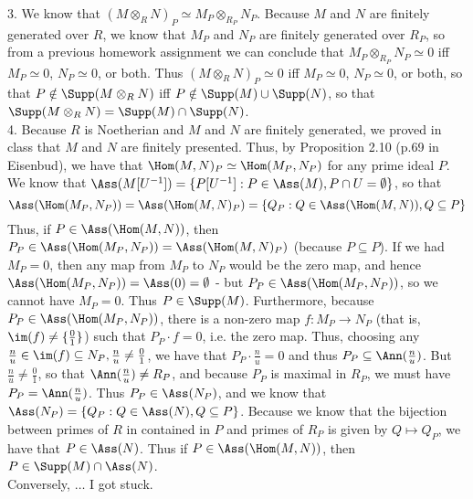 \documentclass[11pt]{article}
\begin{document}
\num{3.} We know that $(M\otimes_R N)_P\simeq M_P\otimes_{R_P}N_P$. Because $M$ and $N$ are finitely generated over $R$, we know that $M_P$ and $N_P$ are finitely generated over $R_P$, so from a previous homework assignment we can conclude that $M_P\otimes_{R_P}N_P\simeq 0$ iff $M_P\simeq 0$, $N_P\simeq 0$, or both. Thus $(M\otimes_R N)_P\simeq 0$ iff $M_P\simeq 0$, $N_P\simeq 0$, or both, so that $P\notin\Supp(M\otimes_R N)$ iff $P\notin\Supp(M)\cup\Supp(N)$, so that $\Supp(M\otimes_R N)=\Supp(M)\cap\Supp(N)$.     \\

\num{4.} Because $R$ is Noetherian and $M$ and $N$ are finitely generated, we proved in class that $M$ and $N$ are finitely presented. Thus, by Proposition 2.10 (p.69 in Eisenbud), we have that $\Hom(M,N)_P\simeq\Hom(M_P,N_P)$ for any prime ideal $P$. We know that $\Ass(M[U^{-1}])=\{P[U^{-1}]:P\in\Ass(M),P\cap U=\emptyset\}$, so that 
\[\Ass(\Hom(M_P,N_P))=\Ass(\Hom(M,N)_P)=\{Q_P:Q\in\Ass(\Hom(M,N)),Q\subseteq P\}\]
Thus, if $P\in\Ass(\Hom(M,N))$, then $P_P\in\Ass(\Hom(M_P,N_P))=\Ass(\Hom(M,N)_P)$ (because $P\subseteq P$). If we had $M_P=0$, then any map from $M_P$ to $N_P$ would be the zero map, and hence $\Ass(\Hom(M_P,N_P))=\Ass(0)=\emptyset$ - but $P_P\in\Ass(\Hom(M_P,N_P))$, so we cannot have $M_P=0$. Thus $P\in\Supp(M)$. Furthermore, because $P_P\in\Ass(\Hom(M_P,N_P))$, there is a non-zero map $f:M_P\rightarrow N_P$ (that is, $\im(f)\neq\{\frac{0}{1}\}$) such that $P_P\cdot f=0$, i.e. the zero map. Thus, choosing any $\frac{n}{u}\in\im(f)\subseteq N_P, \frac{n}{u}\neq\frac{0}{1}$, we have that $P_P\cdot\frac{n}{u}=0$ and thus $P_P\subseteq\Ann(\frac{n}{u})$. But $\frac{n}{u}\neq\frac{0}{1}$, so that $\Ann(\frac{n}{u})\neq R_P$, and because $P_P$ is maximal in $R_P$, we must have $P_P=\Ann(\frac{n}{u})$. Thus $P_P\in\Ass(N_P)$, and we know that $\Ass(N_P)=\{Q_P:Q\in\Ass(N),Q\subseteq P\}$. Because we know that the bijection between primes of $R$ in contained in $P$ and primes of $R_P$ is given by $Q\mapsto Q_P$, we have that $P\in\Ass(N)$. Thus if $P\in\Ass(\Hom(M,N))$, then $P\in\Supp(M)\cap\Ass(N)$.      \\

Conversely, $\ldots$ I got stuck.\\ 
\end{document}
